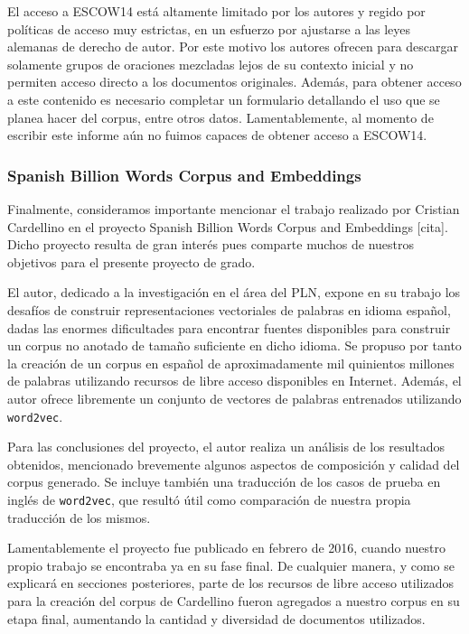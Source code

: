 El acceso a ESCOW14 está altamente limitado por los autores y regido por políticas de acceso muy
estrictas, en un esfuerzo por ajustarse a las leyes alemanas de derecho de autor. Por este motivo
los autores ofrecen para descargar solamente grupos de oraciones mezcladas lejos de su contexto inicial
y no permiten acceso directo a los documentos originales. Además, para obtener acceso a este contenido
es necesario completar un formulario detallando el uso que se planea hacer del corpus, entre otros
datos. Lamentablemente, al momento de escribir este informe aún no fuimos capaces de obtener acceso
a ESCOW14.

\subsubsection{Spanish Billion Words Corpus and Embeddings}

Finalmente, consideramos importante mencionar el trabajo realizado por Cristian Cardellino en el proyecto
Spanish Billion Words Corpus and Embeddings [cita]. Dicho proyecto resulta de gran interés pues
comparte muchos de nuestros objetivos para el presente proyecto de grado.

El autor, dedicado a la investigación en el área del PLN, expone en su trabajo los desafíos de construir
representaciones vectoriales de palabras en idioma español, dadas las enormes dificultades para encontrar
fuentes disponibles para construir un corpus no anotado de tamaño suficiente en dicho idioma. Se propuso
por tanto la creación de un corpus en español de aproximadamente mil quinientos millones de palabras
utilizando recursos de libre acceso disponibles en Internet. Además, el autor ofrece libremente un
conjunto de vectores de palabras entrenados utilizando \texttt{word2vec}.

Para las conclusiones del proyecto, el autor realiza un análisis de los resultados obtenidos, mencionado
brevemente algunos aspectos de composición y calidad del corpus generado. Se incluye también una
traducción de los casos de prueba en inglés de \texttt{word2vec}, que resultó útil como comparación de
nuestra propia traducción de los mismos.

Lamentablemente el proyecto fue publicado en febrero de 2016, cuando nuestro propio trabajo se
encontraba ya en su fase final. De cualquier manera, y como se explicará en secciones posteriores,
parte de los recursos de libre acceso utilizados para la creación del corpus de Cardellino fueron
agregados a nuestro corpus en su etapa final, aumentando la cantidad y diversidad de documentos
utilizados.

